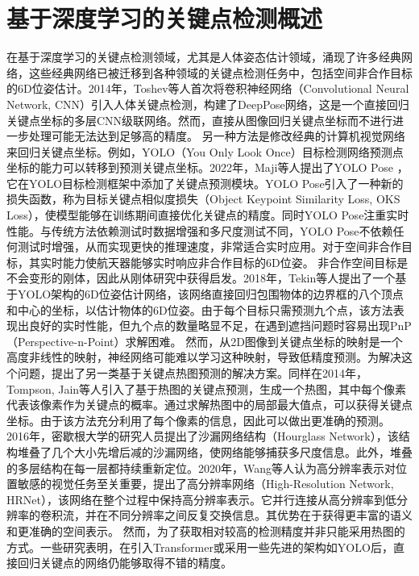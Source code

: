 \section{基于深度学习的关键点检测概述}
在基于深度学习的关键点检测领域，尤其是人体姿态估计领域，涌现了许多经典网络，这些经典网络已被迁移到各种领域的关键点检测任务中，包括空间非合作目标的6D位姿估计。2014年，Toshev等人首次将卷积神经网络（Convolutional Neural Network, CNN）引入人体关键点检测，构建了DeepPose网络，这是一个直接回归关键点坐标的多层CNN级联网络\citep{toshev2014deeppose}。然而，直接从图像回归关键点坐标而不进行进一步处理可能无法达到足够高的精度。
另一种方法是修改经典的计算机视觉网络来回归关键点坐标。例如，YOLO（You Only Look Once）目标检测网络预测点坐标的能力可以转移到预测关键点坐标。2022年，Maji等人提出了YOLO Pose \citep{yolo_pose}，它在YOLO目标检测框架中添加了关键点预测模块。YOLO Pose引入了一种新的损失函数，称为目标关键点相似度损失（Object Keypoint Similarity Loss, OKS Loss），使模型能够在训练期间直接优化关键点的精度。同时YOLO Pose注重实时性能。与传统方法依赖测试时数据增强和多尺度测试不同，YOLO Pose不依赖任何测试时增强，从而实现更快的推理速度，非常适合实时应用。对于空间非合作目标，其实时能力使航天器能够实时响应非合作目标的6D位姿。
非合作空间目标是不会变形的刚体，因此从刚体研究中获得启发。2018年，Tekin等人提出了一个基于YOLO架构的6D位姿估计网络，该网络直接回归包围物体的边界框的八个顶点和中心的坐标，以估计物体的6D位姿\citep{tekin2018real}。由于每个目标只需预测九个点，该方法表现出良好的实时性能，但九个点的数量略显不足，在遇到遮挡问题时容易出现PnP（Perspective-n-Point）求解困难。
然而，从2D图像到关键点坐标的映射是一个高度非线性的映射，神经网络可能难以学习这种映射，导致低精度预测。为解决这个问题，提出了另一类基于关键点热图预测的解决方案。同样在2014年，Tompson, Jain等人引入了基于热图的关键点预测，生成一个热图，其中每个像素代表该像素作为关键点的概率\citep{tompson2014joint}。通过求解热图中的局部最大值点，可以获得关键点坐标。由于该方法充分利用了每个像素的信息，因此可以做出更准确的预测。
2016年，密歇根大学的研究人员提出了沙漏网络结构（Hourglass Network）\citep{newell2016stacked}，该结构堆叠了几个大小先增后减的沙漏网络，使网络能够捕获多尺度信息。此外，堆叠的多层结构在每一层都持续重新定位。2020年，Wang等人认为高分辨率表示对位置敏感的视觉任务至关重要，提出了高分辨率网络（High-Resolution Network, HRNet）\citep{wang2020deep}，该网络在整个过程中保持高分辨率表示。它并行连接从高分辨率到低分辨率的卷积流，并在不同分辨率之间反复交换信息。其优势在于获得更丰富的语义和更准确的空间表示。
然而，为了获取相对较高的检测精度并非只能采用热图的方式。一些研究表明\citep{mao2022poseur, 10394434, lu2024ksl}，在引入Transformer或采用一些先进的架构如YOLO后，直接回归关键点的网络仍能够取得不错的精度。


